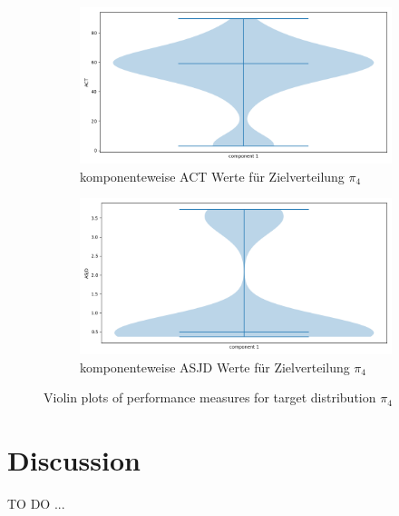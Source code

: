 \documentclass{scrartcl}
\begin{document}
    \begin{figure}
        \centering
        \begin{subfigure}{0.45\textheight}
              \centering
              \includegraphics[width=.8\linewidth]{../figs/ACT_pi_4.png}
              \caption{komponenteweise ACT Werte für Zielverteilung $\pi_4$}
              \label{violin_plots_pi_4_act}
        \end{subfigure}
        \begin{subfigure}{0.45\textheight}
              \centering
              \includegraphics[width=.8\linewidth]{../figs/ASJD_pi_4.png}
              \caption{komponenteweise ASJD Werte für Zielverteilung $\pi_4$}
              \label{violin_plots_pi_4_asjd}
        \end{subfigure}
        \caption{Violin plots of performance measures for target distribution $\pi_4$}
        \label{violin_plots_pi_4}
    \end{figure}

    \section{Discussion}
    TO DO ...
\end{document}
